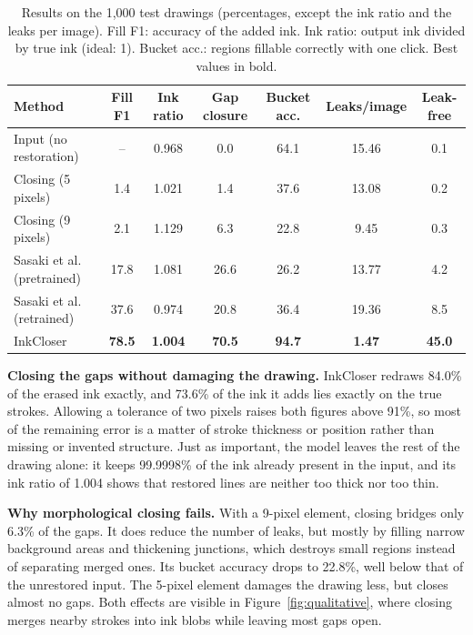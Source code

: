 \documentclass{IEEEcsmag}
\begin{document}
\begin{table}
\caption{Results on the 1,000 test drawings (percentages, except the ink ratio and
the leaks per image). Fill F1: accuracy of the added ink. Ink ratio: output ink
divided by true ink (ideal: 1). Bucket acc.: regions fillable correctly with one
click. Best values in bold.}
\label{tab:results}
\tablefont
\begin{tabular*}{\textwidth}{@{\extracolsep{\fill}}lcccccc@{}}
\toprule
Method & Fill F1 & Ink ratio & Gap closure & Bucket acc. & Leaks/image & Leak-free \\
\midrule
Input (no restoration)      & --            & 0.968          & 0.0           & 64.1          & 15.46         & 0.1 \\
Closing (5 pixels)          & 1.4           & 1.021          & 1.4           & 37.6          & 13.08         & 0.2 \\
Closing (9 pixels)          & 2.1           & 1.129          & 6.3           & 22.8          & 9.45          & 0.3 \\
Sasaki et al. (pretrained)  & 17.8          & 1.081          & 26.6          & 26.2          & 13.77         & 4.2 \\
Sasaki et al. (retrained)   & 37.6          & 0.974          & 20.8          & 36.4          & 19.36         & 8.5 \\
InkCloser                   & \textbf{78.5} & \textbf{1.004} & \textbf{70.5} & \textbf{94.7} & \textbf{1.47} & \textbf{45.0} \\
\bottomrule
\end{tabular*}
\end{table}

\textbf{Closing the gaps without damaging the drawing.} InkCloser redraws 84.0\% of
the erased ink exactly, and 73.6\% of the ink it adds lies exactly on the true
strokes. Allowing a tolerance of two pixels raises both figures above 91\%, so most of
the remaining error is a matter of stroke thickness or position rather than missing
or invented structure. Just as important, the model leaves the rest of the drawing
alone: it keeps 99.9998\% of the ink already present in the input, and its ink ratio
of 1.004 shows that restored lines are neither too thick nor too thin.

\textbf{Why morphological closing fails.} With a 9-pixel element, closing bridges
only 6.3\% of the gaps. It does reduce the number of leaks, but mostly by filling
narrow background areas and thickening junctions, which destroys small regions
instead of separating merged ones. Its bucket accuracy drops to 22.8\%, well below
that of the unrestored input. The 5-pixel element damages the drawing less, but
closes almost no gaps. Both effects are visible in Figure~\ref{fig:qualitative},
where closing merges nearby strokes into ink blobs while leaving most gaps open.
\end{document}

